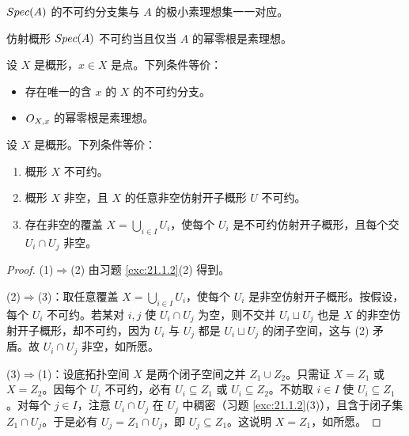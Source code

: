 \begin{corollary}\label{cor:21.3.4}
$Spec(A)$ 的不可约分支集与 $A$ 的极小素理想集一一对应。
\end{corollary}

\begin{corollary}\label{cor:21.3.5}
仿射概形 $Spec(A)$ 不可约当且仅当 $A$ 的幂零根是素理想。
\end{corollary}

\begin{exercise}\label{exc:21.3.6}
设 $X$ 是概形，$x\in X$ 是点。下列条件等价：
\begin{itemize}[leftmargin=1.5em,itemsep=0.15ex]
  \item 存在唯一的含 $x$ 的 $X$ 的不可约分支。
  \item $O_{X,x}$ 的幂零根是素理想。
\end{itemize}
\end{exercise}

\begin{lemma}\label{lem:21.3.7}
设 $X$ 是概形。下列条件等价：
\begin{enumerate}[label=(\roman*),leftmargin=2em,itemsep=0.25ex]
  \item 概形 $X$ 不可约。
  \item 概形 $X$ 非空，且 $X$ 的任意非空仿射开子概形 $U$ 不可约。
  \item 存在非空的覆盖 $X=\bigcup_{i\in I}U_i$，使每个 $U_i$ 是不可约仿射开子概形，且每个交 $U_i\cap U_j$ 非空。
\end{enumerate}
\end{lemma}

\begin{proof}
(1)$\Rightarrow$(2) 由习题 \ref{exc:21.1.2}(2) 得到。

(2)$\Rightarrow$(3)：取任意覆盖 $X=\bigcup_{i\in I}U_i$，使每个 $U_i$ 是非空仿射开子概形。按假设，每个 $U_i$ 不可约。若某对 $i,j$ 使 $U_i\cap U_j$ 为空，则不交并 $U_i\sqcup U_j$ 也是 $X$ 的非空仿射开子概形，却不可约，因为 $U_i$ 与 $U_j$ 都是 $U_i\sqcup U_j$ 的闭子空间，这与 (2) 矛盾。故 $U_i\cap U_j$ 非空，如所愿。

(3)$\Rightarrow$(1)：设底拓扑空间 $X$ 是两个闭子空间之并 $Z_1\cup Z_2$。只需证 $X=Z_1$ 或 $X=Z_2$。因每个 $U_i$ 不可约，必有 $U_i\subseteq Z_1$ 或 $U_i\subseteq Z_2$。不妨取 $i\in I$ 使 $U_i\subseteq Z_1$。对每个 $j\in I$，注意 $U_i\cap U_j$ 在 $U_j$ 中稠密（习题 \ref{exc:21.1.2}(3)），且含于闭子集 $Z_1\cap U_j$。于是必有 $U_j=Z_1\cap U_j$，即 $U_j\subseteq Z_1$。这说明 $X=Z_1$，如所愿。
\end{proof}

